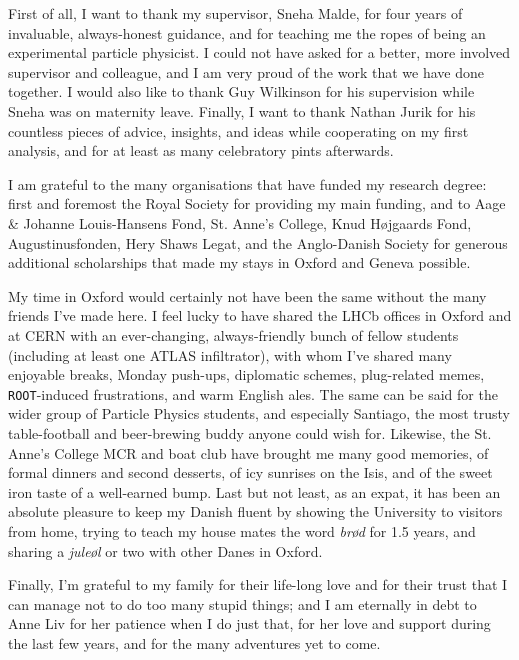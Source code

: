 First of all, I want to thank my supervisor, Sneha Malde, for four years of invaluable, always-honest guidance, and for teaching me the ropes of being an experimental particle physicist.
I could not have asked for a better, more involved supervisor and colleague, and I am very proud of the work that we have done together.
%
I would also like to thank Guy Wilkinson for his supervision while Sneha was on maternity leave. 
%
Finally, I want to thank  Nathan Jurik for his countless pieces of advice, insights, and ideas while cooperating on my first analysis, and for at least as many celebratory pints afterwards.

I am grateful to the many organisations that have funded my research degree: first and foremost the Royal Society for providing my main funding, and to Aage \& Johanne Louis-Hansens Fond, St. Anne's College, Knud H\o jgaards Fond, Augustinusfonden, Hery Shaws Legat, and the Anglo-Danish Society for generous additional scholarships that made my stays in Oxford and Geneva possible.

My time in Oxford would certainly not have been the same without the many friends I've made here. I feel lucky to have shared the LHCb offices in Oxford and at CERN with an ever-changing, always-friendly bunch of fellow students (including at least one ATLAS infiltrator), with whom I've shared many enjoyable breaks, Monday push-ups, diplomatic schemes, plug-related memes, \texttt{ROOT}-induced frustrations, and warm English ales. The same can be said for the wider group of Particle Physics students, and especially Santiago, the most trusty table-football and beer-brewing buddy anyone could wish for. 
%
Likewise, the St. Anne's College MCR and boat club have brought me many good memories, of formal dinners and second desserts, of icy sunrises on the Isis, and of the sweet iron taste of a well-earned bump. 
%
Last but not least, as an expat, it has been an absolute pleasure to keep my Danish fluent by showing the University to visitors from home, trying to teach my house mates the word \emph{br\o d} for 1.5 years, and sharing a \emph{jule\o l} or two with other Danes in Oxford.

Finally, I'm grateful to my family for their life-long love and for their trust that I can manage not to do too many stupid things; and I am eternally in debt to Anne Liv for her patience when I do just that, for her love and support during the last few years, and for the many adventures yet to come.